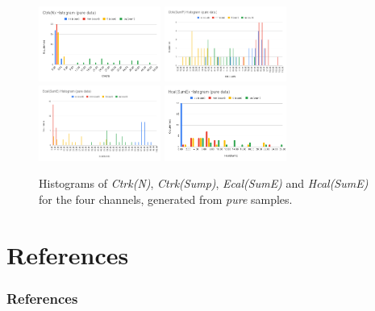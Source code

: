 \documentclass[10pt]{beamer}
\begin{document}
\begin{frame}
\begin{figure}[h!]
  \centering
  \includegraphics[width = 4cm]{CtrkN-pure.png}
  \includegraphics[width = 4cm]{CtrkP-pure.png}
  \includegraphics[width = 4cm]{Ecal-pure.png}
  \includegraphics[width = 4cm]{Hcal-pure.png}
  \caption{Histograms of \textit{Ctrk(N)}, \textit{Ctrk(Sump)}, \textit{Ecal(SumE)} and \textit{Hcal(SumE)} for the four channels, generated from \textit{pure} samples.}
  \label{fig:hist}
\end{figure}
\end{frame}

\section*{References}
\begin{frame}
\frametitle{References}
\printbibliography
\end{frame}
\end{document}
